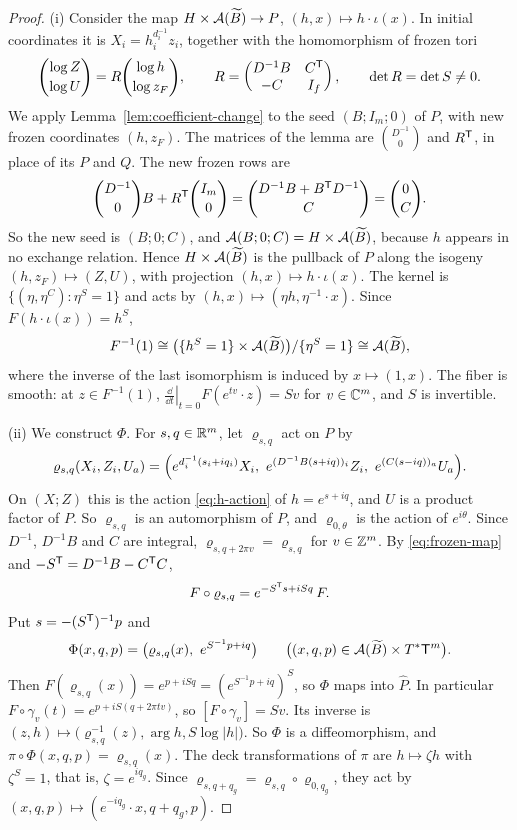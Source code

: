 \documentclass[12pt, letter]{amsart}
\theoremstyle{definition}
\begin{document}
\begin{proof}
(i) Consider the map $H\times\mathcal{A}(\widetilde B)\to P$, $(h,x)\mapsto h\cdot\iota(x)$.
In initial coordinates it is $X_i=h_i^{d_i^{-1}}z_i$, together with the homomorphism of frozen tori
\[
 \binom{\log Z}{\log U}=R\binom{\log h}{\log z_F},\qquad
 R=\begin{pmatrix}D^{-1}B&C^{\mathsf T}\\-C&I_f\end{pmatrix},\qquad \det R=\det S\ne0 .
\]
We apply Lemma~\ref{lem:coefficient-change} to the seed $(B;I_m;0)$ of $P$, with new frozen coordinates $(h,z_F)$.
The matrices of the lemma are $\binom{D^{-1}}{0}$ and $R^{\mathsf T}$, in place of its $P$ and $Q$.
The new frozen rows are
\[
 \binom{D^{-1}}{0}B+R^{\mathsf T}\binom{I_m}{0}=\binom{D^{-1}B+B^{\mathsf T}D^{-1}}{C}=\binom{0}{C}.
\]
So the new seed is $(B;0;C)$, and $\mathcal{A}(B;0;C)=H\times\mathcal{A}(\widetilde B)$, because $h$ appears in no exchange relation.
Hence $H\times\mathcal{A}(\widetilde B)$ is the pullback of $P$ along the isogeny $(h,z_F)\mapsto(Z,U)$, with projection $(h,x)\mapsto h\cdot\iota(x)$.
The kernel is $\{(\eta,\eta^C):\eta^S=1\}$ and acts by $(h,x)\mapsto(\eta h,\eta^{-1}\cdot x)$.
Since $F(h\cdot\iota(x))=h^S$,
\[
 F^{-1}(1)\cong\bigl(\{h^S=1\}\times\mathcal{A}(\widetilde B)\bigr)/\{\eta^S=1\}\cong\mathcal{A}(\widetilde B),
\]
where the inverse of the last isomorphism is induced by $x\mapsto(1,x)$.
The fiber is smooth: at $z\in F^{-1}(1)$, $\left.\frac{\dd}{\dd t}\right|_{t=0}F(e^{tv}\cdot z)=Sv$ for $v\in\mathbb{C}^m$, and $S$ is invertible.

(ii) We construct $\Phi$.
For $s,q\in\mathbb{R}^m$, let $\varrho_{s,q}$ act on $P$ by
\begin{equation}\label{eq:phase-coordinates}
 \varrho_{s,q}(X_i,Z_i,U_a)=\Bigl(e^{d_i^{-1}(s_i+iq_i)}X_i,\ e^{(D^{-1}B(s+iq))_i}Z_i,\ e^{(C(s-iq))_a}U_a\Bigr).
\end{equation}
On $(X;Z)$ this is the action \eqref{eq:h-action} of $h=e^{s+iq}$, and $U$ is a product factor of $P$.
So $\varrho_{s,q}$ is an automorphism of $P$, and $\varrho_{0,\theta}$ is the action of $e^{i\theta}$.
Since $D^{-1}$, $D^{-1}B$ and $C$ are integral, $\varrho_{s,q+2\pi v}=\varrho_{s,q}$ for $v\in\mathbb{Z}^m$.
By \eqref{eq:frozen-map} and $-S^{\mathsf T}=D^{-1}B-C^{\mathsf T}C$,
\[
 F\circ\varrho_{s,q}=e^{-S^{\mathsf T}s+iSq}\,F .
\]
Put $s=-(S^{\mathsf T})^{-1}p$ and
\[
 \Phi(x,q,p)=\bigl(\varrho_{s,q}(x),\ e^{S^{-1}p+iq}\bigr)\qquad\bigl((x,q,p)\in\cA(\widetilde B)\times T^*\T^m\bigr).
\]
Then $F(\varrho_{s,q}(x))=e^{p+iSq}=(e^{S^{-1}p+iq})^S$, so $\Phi$ maps into $\widehat P$.
In particular $F\circ\gamma_v(t)=e^{p+iS(q+2\pi tv)}$, so $[F\circ\gamma_v]=Sv$.
Its inverse is $(z,h)\mapsto\bigl(\varrho_{s,q}^{-1}(z),\arg h,S\log|h|\bigr)$.
So $\Phi$ is a diffeomorphism, and $\pi\circ\Phi(x,q,p)=\varrho_{s,q}(x)$.
The deck transformations of $\pi$ are $h\mapsto\zeta h$ with $\zeta^S=1$, that is, $\zeta=e^{iq_g}$.
Since $\varrho_{s,q+q_g}=\varrho_{s,q}\circ\varrho_{0,q_g}$, they act by $(x,q,p)\mapsto(e^{-iq_g}\cdot x,q+q_g,p)$.


\end{proof}
\end{document}
